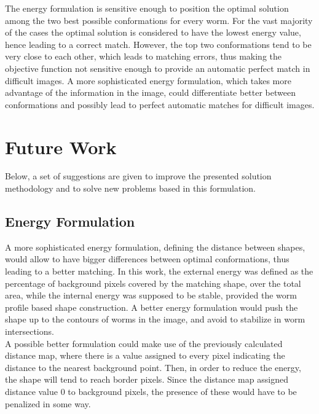 The energy formulation is sensitive enough to position the optimal solution
among the two best possible conformations for every worm. For the vast majority
of the cases the optimal solution is considered to have the lowest 
energy value, hence
leading to a correct match. However, the top two conformations tend to be
very close to each other, which leads to matching errors, thus making
the objective function not sensitive enough to provide an automatic perfect
match in difficult images. A more sophisticated energy formulation, which
takes more advantage of the information in the image, could
differentiate better between conformations and possibly
lead to perfect automatic matches for difficult images.


\section{Future Work}

Below, a set of suggestions are given to improve the presented solution
methodology and to solve new problems based in this formulation.


\subsection*{Energy Formulation}
A more sophisticated energy formulation, defining the distance between 
shapes, would allow to have bigger differences between optimal conformations,
thus leading to a better matching. In this work, the external energy was
defined as the percentage of background pixels covered by the matching shape,
over the total area, while the internal energy was supposed to be stable,
provided the worm profile based shape construction. 
A better energy formulation would push the shape up to the contours of
worms in the image, and avoid to stabilize in worm intersections.\\
A possible better formulation could make use of the previously calculated
distance map, where there is a value assigned to every pixel
indicating the distance to the nearest background point. 
Then, in order to reduce the energy, the shape will tend to reach border pixels.
Since the distance map assigned distance value $0$ to background pixels, the 
presence of these would have to be penalized in some way.


